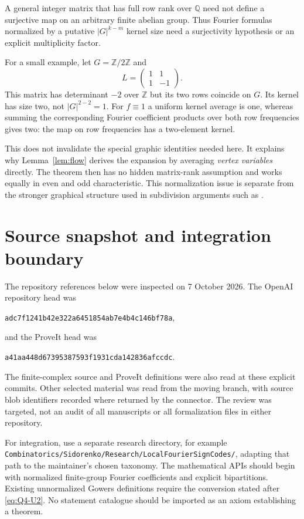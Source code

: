 \documentclass[11pt]{article}
\numberwithin{equation}{section}
\theoremstyle{definition}
\theoremstyle{remark}
\newcommand{\Z}{\mathbb Z}
\newcommand{\Q}{\mathbb Q}
\begin{document}
A general integer matrix that has full row rank over $\Q$ need not
define a surjective map on an arbitrary finite abelian group. Thus
Fourier formulas normalized by a putative $|G|^{k-m}$ kernel size need
a surjectivity hypothesis or an explicit multiplicity factor.

For a small example, let $G=\Z/2\Z$ and
\[
 L=\begin{pmatrix}1&1\\1&-1\end{pmatrix}.
\]
This matrix has determinant $-2$ over $\Z$ but its two rows coincide on
$G$. Its kernel has size two, not $|G|^{2-2}=1$. For $f\equiv1$ a
uniform kernel average is one, whereas summing the corresponding
Fourier coefficient products over both row frequencies gives two:
the map on row frequencies has a two-element kernel.

This does not invalidate the special graphic identities needed here.
It explains why Lemma~\ref{lem:flow} derives the expansion by averaging
\emph{vertex variables} directly. The theorem then has no hidden
matrix-rank assumption and works equally in even and odd characteristic.
This normalization issue is separate from the stronger graphical
structure used in subdivision arguments such as \cite{YuqiZhao}.

\section{Source snapshot and integration boundary}
\label{app:sources}

The repository references below were inspected on 7 October 2026. The
OpenAI repository head was
\begin{center}
\small\texttt{adc7f1241b42e322a6451854ab7e4b4c146bf78a},
\end{center}
and the ProveIt head was
\begin{center}
\small\texttt{a41aa448d67395387593f1931cda142836afccdc}.
\end{center}
The finite-complex source and ProveIt definitions were also read at
these explicit commits. Other selected material was read from the moving
branch, with source blob identifiers recorded where returned by the
connector. The review was targeted, not an audit of all manuscripts or
all formalization files in either repository.

For integration, use a separate research directory, for example
\nolinkurl{Combinatorics/Sidorenko/Research/LocalFourierSignCodes/}, adapting
that path to the maintainer's chosen taxonomy. The mathematical APIs
should begin with normalized finite-group Fourier coefficients and
explicit bipartitions. Existing unnormalized Gowers definitions require
the conversion stated after \eqref{eq:Q4-U2}. No statement catalogue
should be imported as an axiom establishing a theorem.
\end{document}
